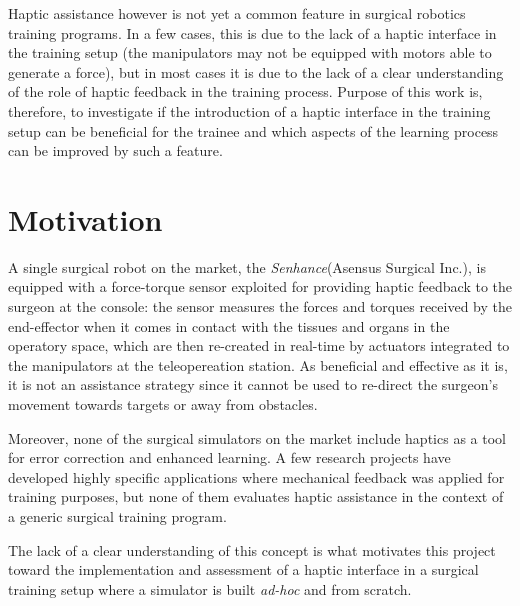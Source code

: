 \documentclass[../main.tex]{subfiles}
\begin{document}
Haptic assistance however is not yet a common feature in surgical robotics training programs. In a few cases, this is due to the lack of a haptic interface in the training setup (the manipulators may not be equipped with motors able to generate a force), but in most cases it is due to the lack of a clear understanding of the role of haptic feedback in the training process. Purpose of this work is, therefore, to investigate if the introduction of a haptic interface in the training setup can be beneficial for the trainee and which aspects of the learning process can be improved by such a feature.
\section{Motivation}
A single surgical robot on the market, the \textit{Senhance}\cright (Asensus Surgical Inc.), is equipped with a force-torque sensor exploited for providing haptic feedback to the surgeon at the console: the sensor measures the forces and torques received by the end-effector when it comes in contact with the tissues and organs in the operatory space, which are then re-created in real-time by actuators integrated to the manipulators at the teleopereation station. As beneficial and effective as it is, it is not an assistance strategy since it cannot be used to re-direct the surgeon's movement towards targets or away from obstacles.

Moreover, none of the surgical simulators on the market include haptics as a tool for error correction and enhanced learning. A few research projects have developed highly specific applications where mechanical feedback was applied for training purposes, but none of them evaluates haptic assistance in the context of a generic surgical training program. 

The lack of a clear understanding of this concept is what motivates this project toward the implementation and assessment of a haptic interface in a surgical training setup where a \vr simulator is built \textit{ad-hoc} and from scratch.

% 
% 
\end{document}
